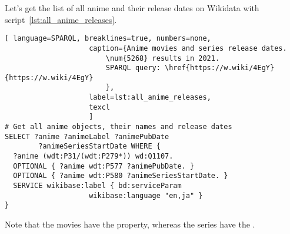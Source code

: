 Let's get the list of all anime and their release dates on Wikidata with script~\ref{lst:all_anime_releases}.

\begin{lstlisting}[ language=SPARQL, breaklines=true, numbers=none,
                    caption={Anime movies and series release dates.
                        \num{5268} results in 2021.
                        SPARQL query: \href{https://w.wiki/4EgY}{https://w.wiki/4EgY}
                        },
                    label=lst:all_anime_releases,
                    texcl 
                    ]
# Get all anime objects, their names and release dates
SELECT ?anime ?animeLabel ?animePubDate
		?animeSeriesStartDate WHERE {
  ?anime (wdt:P31/(wdt:P279*)) wd:Q1107.
  OPTIONAL { ?anime wdt:P577 ?animePubDate. }
  OPTIONAL { ?anime wdt:P580 ?animeSeriesStartDate. }
  SERVICE wikibase:label { bd:serviceParam
					wikibase:language "en,ja" }
}
\end{lstlisting}%

Note that the movies have the  property, whereas the series have the .